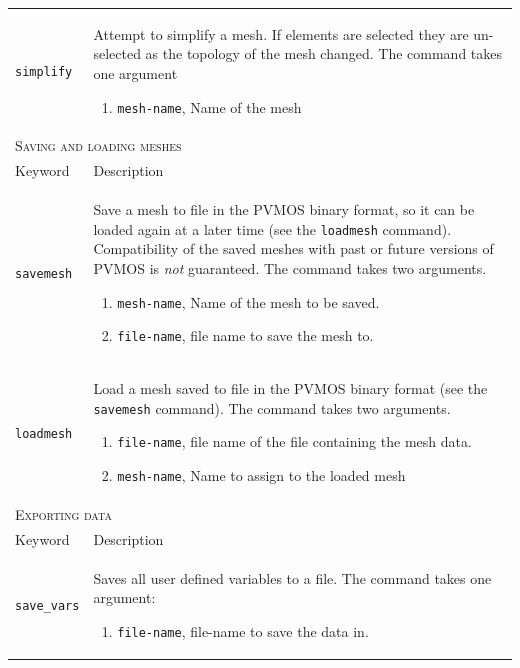 \documentclass[noshowpacs,preprintnumbers,amsmath,amssymb, letter]{revtex4}
\begin{document}
\begin{longtable}{p{}p{}}
\texttt{simplify}	&  Attempt to simplify a mesh. If elements are selected they are un-selected as the topology of the mesh changed. The command takes one argument 
\begin{enumerate}
\item \texttt{mesh-name}, Name of the mesh
\end{enumerate}\\
\multicolumn{2}{l}{\textsc{Saving and loading meshes}} \\*
\hline
Keyword & Description \\
\texttt{savemesh}	& Save a mesh to file in the PVMOS binary format, so it can be loaded again at a later time (see the \texttt{loadmesh} command). Compatibility of the saved meshes with past or future versions of PVMOS is \emph{not} guaranteed. The command takes two arguments.
\begin{enumerate}
\item \texttt{mesh-name}, Name of the mesh to be saved.
\item \texttt{file-name}, file name to save the mesh to.
\end{enumerate}\\
\texttt{loadmesh}	& Load a mesh saved to file in the PVMOS binary format (see the \texttt{savemesh} command). The command takes two arguments.
\begin{enumerate}
\item \texttt{file-name}, file name of the file containing the mesh data.
\item \texttt{mesh-name}, Name to assign to the loaded mesh
\end{enumerate}\\
\multicolumn{2}{l}{\textsc{Exporting data}} \\*
\hline
Keyword & Description \\
\texttt{save\_vars}	& Saves all user defined variables to a file. The command takes one argument:
\begin{enumerate}
\item \texttt{file-name}, file-name to save the data in.
\end{enumerate}\\

\end{longtable}
\end{document}
